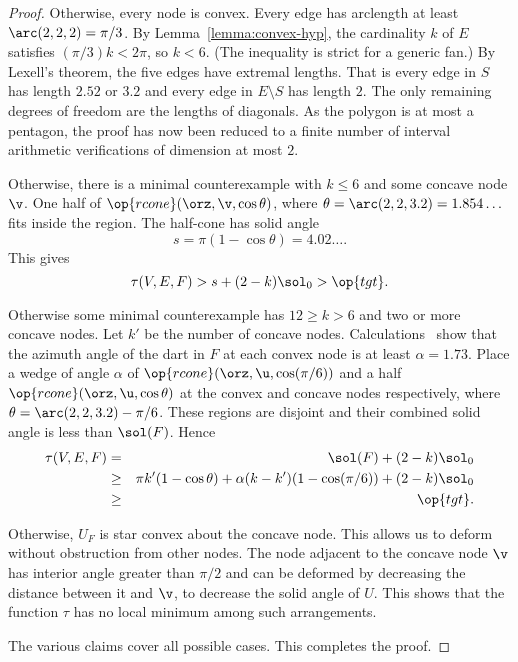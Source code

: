 \begin{proof}
  Otherwise,
every node is convex.  Every edge has arclength at least
$\arc(2,2,2)=\pi/3$.  By Lemma~\ref{lemma:convex-hyp}, the cardinality
$k$ of $E$ satisfies $(\pi/3)k < 2\pi$, so $k<6$.  (The inequality is
strict for a generic fan.)  By Lexell's theorem, the five edges have
extremal lengths.  That is every edge in $S$ has length $2.52$ or
$3.2$ and every edge in $E\setminus S$ has length $2$.  The only
remaining degrees of freedom are the lengths of diagonals.  As the
polygon is at most a pentagon, the proof has now been reduced to a
finite number of interval arithmetic verifications of dimension at
most $2$.

  Otherwise, there is a
minimal counterexample with $k\le 6$ and some concave node $\v$. One
half of $\op{rcone}(\orz,\v,\cos\theta)$, where
$\theta=\arc(2,2,3.2)=1.854\ldots$ fits inside the region.  The
half-cone has solid angle
\begin{displaymath}
s=\pi(1-\cos\theta)=4.02\ldots.
\end{displaymath}
This gives
\begin{displaymath}
\tau(V,E,F) > s + (2-k)\sol_0 > \op{tgt}.
\end{displaymath}
%


  Otherwise some minimal counterexample has $12\ge k>6$ and
two or more concave nodes.  Let $k'$ be the number of concave  nodes.  
Calculations~\cite[cc:lft]{hales:2009:nonlinear}%
show that the azimuth angle of the dart in $F$ at each convex node is
at least $\alpha=1.73$.  Place a wedge of angle $\alpha$ of
$\op{rcone}(\orz,\u,\cos(\pi/6))$ and a half
$\op{rcone}(\orz,\u,\cos\theta)$ at the convex and concave nodes
respectively, where $\theta=\arc(2,2,3.2)-\pi/6$.  These regions are
disjoint and their combined solid angle is less than $\sol(F)$.  Hence
\begin{eqnarray*}
\tau(V,E,F)&=&\sol(F)+(2-k)\sol_0 \\
&\ge& \pi k' (1-\cos\theta)
+ \alpha (k-k') (1-\cos(\pi/6)) + (2-k)\sol_0\\
&\ge&\op{tgt}.\\
\end{eqnarray*}


 Otherwise, $U_F$ is star convex about the concave
node.  This allows us to deform without obstruction from other nodes.
The node adjacent to the concave node $\v$ has interior angle greater
than $\pi/2$ and can be deformed by decreasing the distance between it
and $\v$, to decrease the solid angle of $U$.  This shows that the
function $\tau$ has no local minimum among such arrangements.
%
%

The various claims cover all possible cases.  This completes the
proof.
\end{proof}

